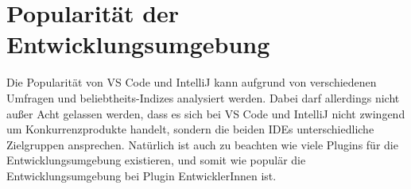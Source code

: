 




\section{Popularität der Entwicklungsumgebung}
\label{sec:Kriterien_Popularität}
Die Popularität von VS Code und IntelliJ kann aufgrund
von verschiedenen Umfragen und beliebtheits-Indizes 
analysiert werden. Dabei darf allerdings nicht außer
Acht gelassen werden, dass es sich bei VS Code und
IntelliJ nicht zwingend um Konkurrenzprodukte handelt,
sondern die beiden IDEs unterschiedliche Zielgruppen ansprechen.
Natürlich ist auch zu beachten wie viele Plugins 
für die Entwicklungsumgebung existieren, und somit wie 
populär die Entwicklungsumgebung bei Plugin EntwicklerInnen ist. 

